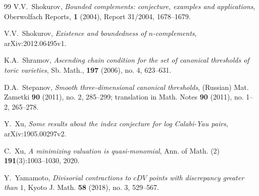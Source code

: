 \documentclass[11pt]{amsart}
\numberwithin{equation}{section}
\theoremstyle{definition}
\theoremstyle{definition}
\begin{document}
\begin{thebibliography}{99}
 V.V.~Shokurov, \textit{Bounded complements: conjecture, examples and applications}, Oberwolfach Reports, \textbf{1} (2004), Report 31/2004, 1678--1679.

	 V.V.~Shokurov, \textit{Existence and boundedness of $n$-complements}, arXiv:2012.06495v1.

 K.A.~Shramov, \textit{Ascending chain condition for the set of canonical thresholds of toric varieties}, Sb. Math., \textbf{197} (2006), no. 4, 623--631.

 D.A.~Stepanov, \textit{Smooth three-dimensional canonical thresholds}, (Russian) Mat. Zametki \textbf{90} (2011), no. 2, 285--299; translation in Math. Notes \textbf{90} (2011), no. 1--2, 265--278.

Y.~Xu, \textit{Some results about the index conjecture for log Calabi-Yau pairs},
arXiv:1905.00297v2.

C.~Xu, \textit{A minimizing valuation is quasi-monomial},
Ann. of Math. (2) \textbf{191}(3):1003--1030, 2020.

 Y.~Yamamoto, \textit{Divisorial contractions to $cDV$ points with discrepancy greater than $1$}, Kyoto J. Math. \textbf{58} (2018), no. 3, 529--567.
\end{thebibliography}
\end{document}
